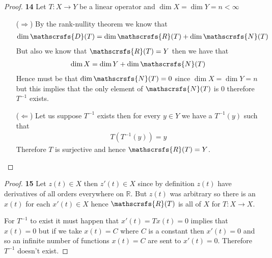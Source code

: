 \documentclass[11pt]{article}
\newcommand{\R}{\mathbb{R}}
\newcommand{\dom}{\mathscrsfs{D}}
\newcommand{\range}{\mathscrsfs{R}}
\newcommand{\nullsp}{\mathscrsfs{N}}
\theoremstyle{definition}
\begin{document}
\cleardoublepage
\begin{proof}{\textbf{14}}
    Let $T: X \to Y$ be a linear operator and $\dim X = \dim Y = n < \infty$
    \begin{itemize}
        \item [($\Rightarrow$)] By the rank-nullity theorem we know that 
        \begin{align*}
            \dim \dom(T) = \dim \range(T) + \dim \nullsp(T)
        \end{align*}
        But also we know that $\range(T) = Y$ then we have that 
        \begin{align*}
            \dim X = \dim Y + \dim \nullsp(T)
        \end{align*}
        Hence must be that $\dim \nullsp(T) = 0$ since $\dim X = \dim Y = n$
        but this implies that the only element of $\nullsp(T)$ is $0$
        therefore $T^{-1}$ exists.

        \item [($\Leftarrow$)] Let us suppose $T^{-1}$ exists 
        then for every $y \in Y$ we have a $T^{-1}(y)$ such that
        \begin{align*}
            T(T^{-1}(y)) = y
        \end{align*}
        Therefore $T$ is surjective and hence $\range(T) = Y$.
    \end{itemize}
\end{proof}
\begin{proof}{\textbf{15}}
    Let $z(t) \in X$ then $z'(t) \in X$ since by definition $z(t)$ have
    derivatives of all orders everywhere on $\R$. But $z(t)$ was arbitrary
    so there is an $x(t)$ for each $x'(t) \in X$ hence $\range(T)$
    is all of $X$ for $T:X \to X$.

    For $T^{-1}$ to exist it must happen that $x'(t) = Tx(t) = 0$ implies that
    $x(t) = 0$ but if we take $x(t) = C$ where $C$ is a constant then
    $x'(t) = 0$ and so an infinite number of functions $x(t) = C$ are sent to
    $x'(t) = 0$. Therefore $T^{-1}$ doesn't exist.
\end{proof}
\cleardoublepage
\end{document}
